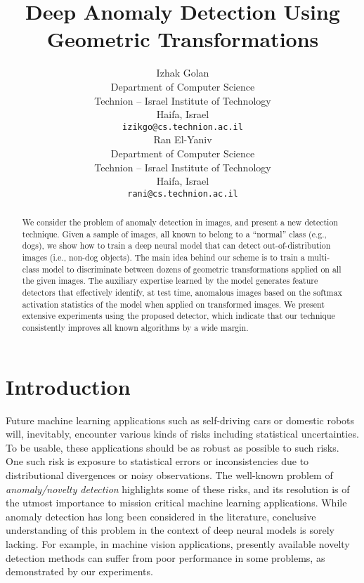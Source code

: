 \documentclass{article}
\title{Deep Anomaly Detection Using Geometric Transformations}
\author{
	Izhak Golan \\
	Department of Computer Science\\
	Technion -- Israel Institute of Technology \\
	Haifa, Israel \\
	\texttt{izikgo@cs.technion.ac.il} \\
	\And
	Ran El-Yaniv \\
	Department of Computer Science\\
	Technion -- Israel Institute of Technology \\
	Haifa, Israel \\
	\texttt{rani@cs.technion.ac.il}
}
\begin{document}
	
	\maketitle
	
	\begin{abstract}
		We consider the problem of anomaly detection in images, and 
		present a new detection technique. Given a sample
		of images, all known to belong to a ``normal'' class (e.g., dogs), 
		we show how to train a deep neural model that can detect 
		out-of-distribution images (i.e., non-dog objects). The main 
		idea behind our scheme is to train a multi-class model to discriminate between
		dozens of geometric transformations applied on all the given images. The auxiliary expertise learned by the model generates 
		feature detectors that effectively identify, at test time, anomalous images based on 
		the softmax activation statistics of the model when applied on transformed images.
		We present extensive experiments using the proposed detector, which indicate that our technique consistently improves all known algorithms by a wide margin.
	\end{abstract}
	
	\section{Introduction}
	
	
	Future machine learning applications such as self-driving cars or domestic robots will, inevitably, encounter various kinds of risks including statistical uncertainties. To be usable, these applications should be as robust as possible to such risks. One such risk is exposure to statistical errors or inconsistencies due to distributional divergences or noisy observations. The well-known problem of {\em anomaly/novelty detection} highlights some of these risks, and its resolution is of the utmost importance to mission critical machine learning applications. While anomaly detection has long been considered in the literature, conclusive understanding of this problem in the context of deep neural models is sorely lacking.
	For example, in machine vision applications, presently available novelty detection methods can suffer from poor performance in some problems, as demonstrated by our experiments.
	
\end{document}

